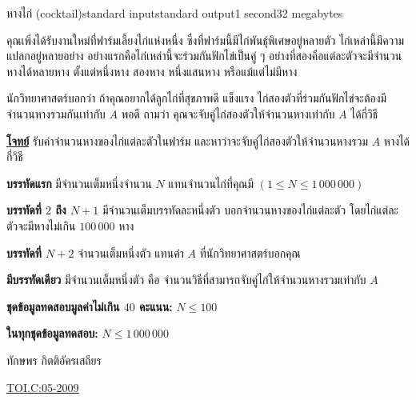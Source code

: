 \documentclass[11pt,a4paper]{article}
\begin{document}
\begin{problem}{หางไก่ (cocktail)}{standard input}{standard output}{1 second}{32 megabytes}

คุณเพิ่งได้รับงานใหม่ที่ฟาร์มเลี้ยงไก่แห่งหนึ่ง ซึ่งที่ฟาร์มนี้มีไก่พันธุ์พิเศษอยู่หลายตัว ไก่เหล่านี้มีความแปลกอยู่หลายอย่าง อย่างแรกคือไก่เหล่านี้จะร่วมกันฟักไข่เป็นคู่ ๆ อย่างที่สองคือแต่ละตัวจะมีจำนวนหางได้หลายหาง ตั้งแต่หนึ่งหาง สองหาง หนึ่งแสนหาง หรือแม้แต่ไม่มีหาง

    นักวิทยาศาสตร์บอกว่า ถ้าคุณอยากได้ลูกไก่ที่สุขภาพดี แข็งแรง ไก่สองตัวที่ร่วมกันฟักไข่จะต้องมีจำนวนหางรวมกันเท่ากับ $A$ พอดี ถามว่า คุณจะจับคู่ไก่สองตัวให้จำนวนหางเท่ากับ $A$ ได้กี่วิธี

\bigskip
\underline{\textbf{โจทย์}}    รับค่าจำนวนหางของไก่แต่ละตัวในฟาร์ม และหาว่าจะจับคู่ไก่สองตัวให้จำนวนหางรวม $A$ หางได้กี่วิธี

\InputFile
\textbf{บรรทัดแรก} มีจำนวนเต็มหนึ่งจำนวน $N$ แทนจำนวนไก่ที่คุณมี $(1 \leq N \leq 1\,000\,000)$

\textbf{บรรทัดที่ $2$ ถึง $N+1$} มีจำนวนเต็มบรรทัดละหนึ่งตัว บอกจำนวนหางของไก่แต่ละตัว โดยไก่แต่ละตัวจะมีหางไม่เกิน $100\,000$ หาง

\textbf{บรรทัดที่ $N+2$ }จำนวนเต็มหนึ่งตัว แทนค่า $A$ ที่นักวิทยาศาสตร์บอกคุณ


\OutputFile

\textbf{มีบรรทัดเดียว} มีจำนวนเต็มหนึ่งตัว คือ จำนวนวิธีที่สามารถจับคู่ไก่ให้จำนวนหางรวมเท่ากับ $A$


\Examples

\begin{example}
%
\end{example}

\Scoring

\textbf{ชุดข้อมูลทดสอบมูลค่าไม่เกิน $40$ คะแนน:} $N\leq 100$ 

\textbf{ในทุกชุดข้อมูลทดสอบ:} $N\leq 1\,000\,000$ 

\Source

ทักษพร กิตติอัครเสถียร

\underline{\href{http://www.thailandoi.org/toi.c/05-2009}{TOI.C:05-2009}}


\end{problem}
\end{document}
